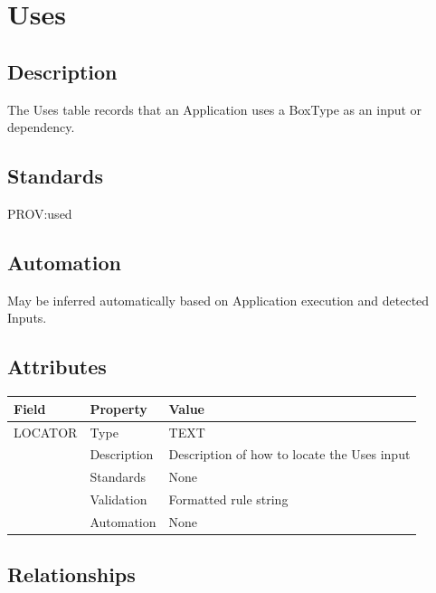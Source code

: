 \section{Uses}\label{uses}

\subsection{Description}\label{description-36}

The Uses table records that an Application uses a BoxType as an input or
dependency.

\subsection{Standards}\label{standards-38}

PROV:used

\subsection{Automation}\label{automation-38}

May be inferred automatically based on Application execution and
detected Inputs.

\subsection{Attributes}\label{attributes-32}

\begin{longtable}[]{@{}lll@{}}
\toprule\noalign{}
Field & Property & Value \\
\midrule\noalign{}
\endhead
\bottomrule\noalign{}
\endlastfoot
LOCATOR & Type & TEXT \\
& Description & Description of how to locate the Uses input \\
& Standards & None \\
& Validation & Formatted rule string \\
& Automation & None \\
\end{longtable}

\subsection{Relationships}\label{relationships-31}

